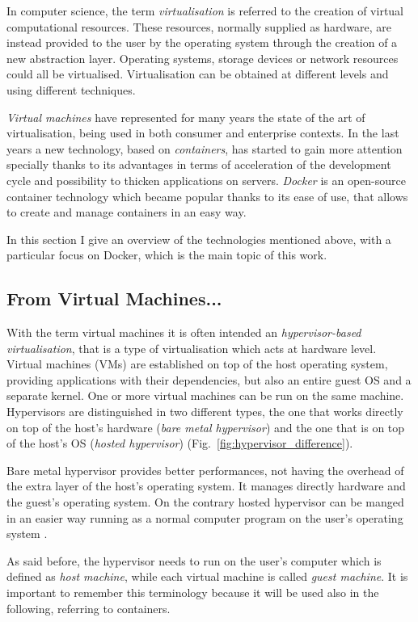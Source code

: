 \documentclass[a4paper,12pt]{article}
\def\myfig#1{Fig.~#1\xspace}
\begin{document}
In computer science, the term \textit{virtualisation}
\cite{wikipedia_virtualization} is referred to the creation of virtual
computational resources. These resources, normally supplied as hardware, are
instead provided to the user by the operating system through the creation of a
new abstraction layer. Operating systems, storage devices or network resources
could all be virtualised. Virtualisation can be obtained at different levels and
using different techniques. \par\textit{Virtual machines} have represented for
many years the state of the art of virtualisation, being used in both consumer
and enterprise contexts. In the last years a new technology, based on
\textit{containers}, has started to gain more attention specially thanks to its
advantages in terms of acceleration of the development cycle and possibility to
thicken applications on servers. \textit{Docker} is an open-source container
technology which became popular thanks to its ease of use, that allows to
create and manage containers in an easy way. \par In this section I give an
overview of the technologies mentioned above, with a particular focus on Docker,
which is the main topic of this work.

\subsection{From Virtual Machines...}

With the term virtual machines it is often intended an \textit{hypervisor-based
virtualisation}, that is a type of virtualisation which acts at hardware level.
Virtual machines (VMs) are established on top of the host operating system,
providing applications with their dependencies, but also an entire guest OS and
a separate kernel. One or more virtual machines can be run on the same machine.
Hypervisors are distinguished in two different types, the one that works
directly on top of the host's hardware (\textit{bare metal hypervisor}) and the
one that is on top of the host's OS (\textit{hosted hypervisor})
(\myfig{\ref{fig:hypervisor_difference}}). \par Bare metal hypervisor provides
better performances, not having the overhead of the extra layer of the host's
operating system. It manages directly hardware and the guest's operating system.
On the contrary hosted hypervisor can be manged in an easier way running as a
normal computer program on the user's operating
system \cite{bui_docker_security}. \par As said before, the hypervisor needs to
run on the user's computer which is defined as \textit{host machine}, while each
virtual machine is called \textit{guest machine}. It is important to remember
this terminology because it will be used also in the following, referring to
containers. 
\end{document}
